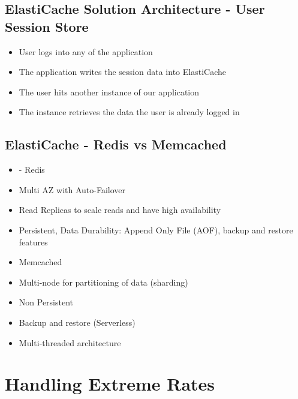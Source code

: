 \subsection{ElastiCache Solution Architecture - User Session Store}
\begin{itemize}
    \item User logs into any of the application
    \item The application writes the session data into ElastiCache
    \item The user hits another instance of our application
    \item The instance retrieves the data the user is already logged in
\end{itemize}

\subsection{ElastiCache - Redis vs Memcached}
\begin{itemize}
    \item - Redis
    \item Multi AZ with Auto-Failover
    \item Read Replicas to scale reads and have high availability
    \item Persistent, Data Durability: Append Only File (AOF), backup and restore features
    \item Memcached
    \item Multi-node for partitioning of data (sharding)
    \item Non Persistent
    \item Backup and restore (Serverless)
    \item Multi-threaded architecture
\end{itemize}


\section{Handling Extreme Rates}
